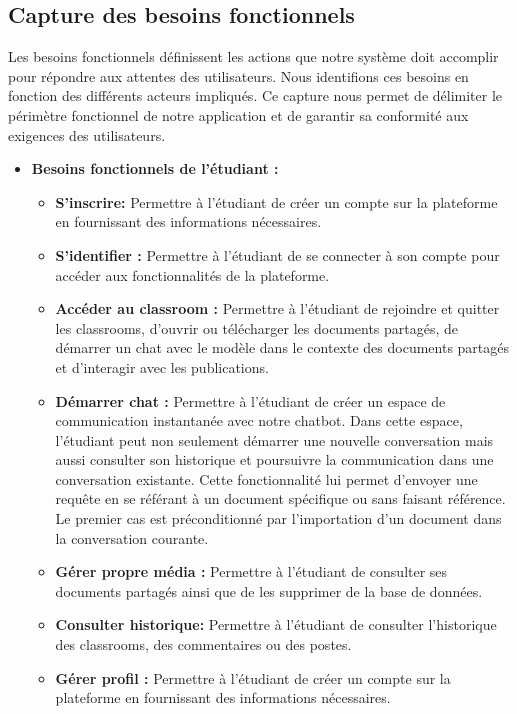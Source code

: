 \subsection{Capture des besoins fonctionnels}
\justifying
Les besoins fonctionnels définissent les actions que notre système doit accomplir pour répondre aux attentes des utilisateurs. Nous identifions ces besoins en fonction des différents acteurs impliqués. Ce capture nous permet de délimiter le périmètre fonctionnel de notre application et de garantir sa conformité aux exigences des utilisateurs.
\begin{itemize}[itemsep=2pt, parsep=2pt]
    \item \textbf{Besoins fonctionnels de l'étudiant :} 
    \begin{itemize}[itemsep=1pt, parsep=1pt]
        \item \textbf{S'inscrire: }Permettre à l'étudiant de créer un compte sur la plateforme en fournissant des informations nécessaires.
        \item \textbf{S'identifier : }Permettre à l’étudiant de se connecter à son compte pour accéder aux fonctionnalités de la plateforme.
        \item \textbf{Accéder au classroom : } Permettre à l'étudiant de rejoindre et quitter les classrooms, d’ouvrir ou télécharger les documents partagés, de démarrer un chat avec le modèle dans le contexte des documents partagés et d'interagir avec les publications.
        \item \textbf{Démarrer chat : }Permettre à l'étudiant de créer un espace de communication instantanée avec notre chatbot. Dans cette espace, l'étudiant peut non seulement démarrer une nouvelle conversation mais aussi consulter son historique et poursuivre la communication dans une conversation existante. Cette fonctionnalité lui permet d’envoyer une requête en se référant à un document spécifique ou sans faisant référence. Le premier cas est préconditionné par l’importation d’un document dans la conversation courante. 
        \item \textbf{Gérer propre média : }Permettre à l'étudiant de consulter ses documents partagés ainsi que de les supprimer de la base de données.
        \item \textbf{Consulter historique: }Permettre à l’étudiant de consulter l’historique des classrooms, des commentaires ou des postes.
        \item \textbf{Gérer profil : }Permettre à l'étudiant de créer un compte sur la plateforme en fournissant des informations nécessaires.

\end{itemize}
\end{itemize}
